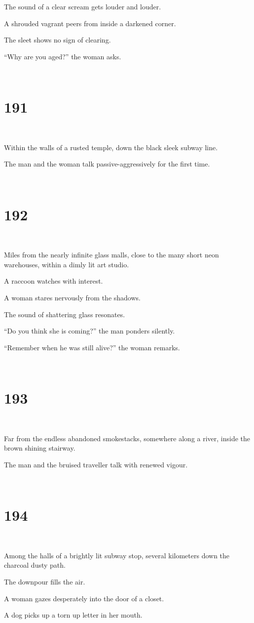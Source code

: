 \documentclass{report}
\begin{document}
The sound of a clear scream gets louder and louder.

A shrouded vagrant peers from inside a darkened corner.

The sleet shows no sign of clearing.

``Why are you aged?'' the woman asks.

~
\chapter*{191}
~

Within the walls of a rusted temple, down the black sleek subway line.

The man and the woman talk passive-aggressively for the first time.

~
\chapter*{192}
~

Miles from the nearly infinite glass malls, close to the many short neon warehouses, within a dimly lit art studio.

A raccoon watches with interest.

A woman stares nervously from the shadows.

The sound of shattering glass resonates.

``Do you think she is coming?'' the man ponders silently.

``Remember when he was still alive?'' the woman remarks.

~
\chapter*{193}
~

Far from the endless abandoned smokestacks, somewhere along a river, inside the brown shining stairway.

The man and the bruised traveller talk with renewed vigour.

~
\chapter*{194}
~

Among the halls of a brightly lit subway stop, several kilometers down the charcoal dusty path.

The downpour fills the air.

A woman gazes desperately into the door of a closet.

A dog picks up a torn up letter in her mouth.
\end{document}
